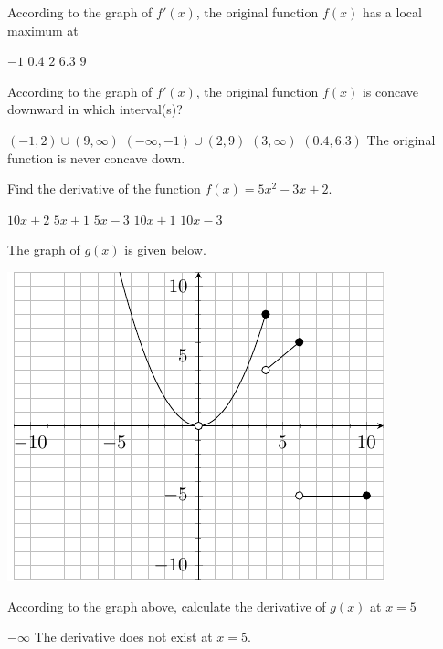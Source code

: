 \documentclass[11pt]{article}
\begin{document}
\begin{questions}
\begin{multiplechoice}{5}

\question According to the graph of $f'(x)$, the original function $f(x)$ has a local maximum at
\begin{answers}{3}
\ans $-1$
\ans $0.4$
\ans $2$
\ans $6.3$
\ans $9$
\end{answers}


\question According to the graph of $f'(x)$, the original function $f(x)$ is concave downward in which interval(s)?
\begin{answers}{3}
\ans $(-1,2) \cup (9, \infty)$
\ans $(-\infty, -1) \cup (2,9)$
\ans $(3, \infty)$
\ans $(0.4,6.3)$
\ans The original function is never concave down.
\end{answers}


\question Find the derivative of the function $f(x) = 5x^2 - 3x + 2$.
\begin{answers}{2}
\ans $10x + 2$
\ans $5x + 1$
\ans $ 5x -3$
\ans $10x +1$
\ans $10x - 3$
\end{answers}

\newpage

The graph of $g(x)$ is given below.\\

\begin{minipage}{\linewidth}%
\centering
\makebox[\linewidth]{}
\includegraphics{exam2graph2.pdf}
\label{graph2exam1}%
\end{minipage}
\question According to the graph above, calculate the derivative of $g(x)$ at $x = 5$
\begin{answers}{2}
\ans $-\infty$
\ans The derivative does not exist at $x=5$.
\end{answers}


\end{multiplechoice}
\end{questions}
\end{document}

